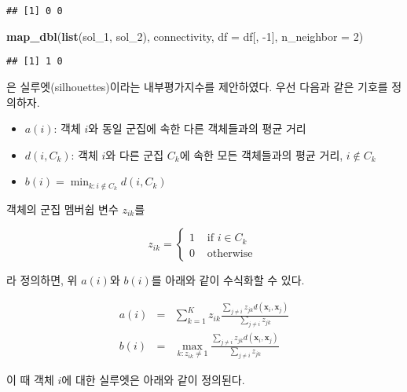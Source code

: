 \documentclass[]{book}
\newenvironment{Shaded}{\begin{snugshade}}{\end{snugshade}}
\newcommand{\DataTypeTok}[1]{\textcolor[rgb]{0.13,0.29,0.53}{#1}}
\newcommand{\DecValTok}[1]{\textcolor[rgb]{0.00,0.00,0.81}{#1}}
\newcommand{\KeywordTok}[1]{\textcolor[rgb]{0.13,0.29,0.53}{\textbf{#1}}}
\newcommand{\NormalTok}[1]{#1}
\providecommand{\tightlist}{%
  \setlength{\itemsep}{0pt}\setlength{\parskip}{0pt}}
\begin{document}
\begin{verbatim}
## [1] 0 0
\end{verbatim}

\begin{Shaded}
\begin{Highlighting}[]
\KeywordTok{map_dbl}\NormalTok{(}\KeywordTok{list}\NormalTok{(sol_}\DecValTok{1}\NormalTok{, sol_}\DecValTok{2}\NormalTok{), connectivity, }\DataTypeTok{df =}\NormalTok{ df[, }\DecValTok{-1}\NormalTok{], }\DataTypeTok{n_neighbor =} \DecValTok{2}\NormalTok{)}
\end{Highlighting}
\end{Shaded}

\begin{verbatim}
## [1] 1 0
\end{verbatim}

\citet{rousseeuw1987silhouettes} 은 실루엣(silhouettes)이라는 내부평가지수를 제안하였다. 우선 다음과 같은 기호를 정의하자.

\begin{itemize}
\tightlist
\item
  \(a(i)\): 객체 \(i\)와 동일 군집에 속한 다른 객체들과의 평균 거리
\item
  \(d(i, C_k)\): 객체 \(i\)와 다른 군집 \(C_k\)에 속한 모든 객체들과의 평균 거리, \(i \notin C_k\)
\item
  \(b(i) = \min_{k: i \notin C_k} d(i, C_k)\)
\end{itemize}

객체의 군집 멤버쉽 변수 \(z_{ik}\)를

\begin{equation*}
z_{ik} = \begin{cases}
1 & \text{ if } i \in C_k\\
0 & \text{ otherwise }
\end{cases}
\end{equation*}

라 정의하면, 위 \(a(i)\)와 \(b(i)\)를 아래와 같이 수식화할 수 있다.

\begin{eqnarray*}
a(i) &=& \sum_{k = 1}^{K} z_{ik} \frac{\sum_{j \neq i} z_{jk} d(\mathbf{x}_i, \mathbf{x}_j)}{\sum_{j \neq i} z_{jk}}\\
b(i) &=& \max_{k: z_{ik} \neq 1} \frac{\sum_{j \neq i} z_{jk} d(\mathbf{x}_i, \mathbf{x}_j)}{\sum_{j \neq i} z_{jk}}
\end{eqnarray*}

이 때 객체 \(i\)에 대한 실루엣은 아래와 같이 정의된다.
\end{document}
